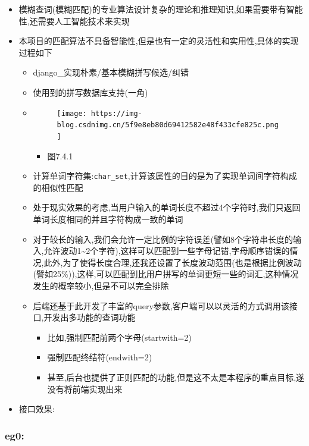 \documentclass[
]{article}
\begin{document}
\begin{itemize}
\item
  模糊查词(模糊匹配)的专业算法设计复杂的理论和推理知识,如果需要带有智能性,还需要人工智能技术来实现
\item
  本项目的匹配算法不具备智能性,但是也有一定的灵活性和实用性,具体的实现过程如下

  \begin{itemize}
  \item
    django\_实现朴素/基本模糊拼写候选/纠错
  \item
    使用到的拼写数据库支持(一角)
  \item
    \begin{figure}
    \centering
    \texttt{[image: https://img-blog.csdnimg.cn/5f9e8eb80d69412582e48f433cfe825c.png]}
    \caption{}
    \end{figure}

    \begin{itemize}
    \item
      图7.4.1
    \end{itemize}
  \item
    计算单词字符集:\texttt{char\_set},计算该属性的目的是为了实现单词间字符构成的相似性匹配
  \item
    处于现实效果的考虑,当用户输入的单词长度不超过4个字符时,我们只返回单词长度相同的并且字符构成一致的单词
  \item
    对于较长的输入,我们会允许一定比例的字符误差(譬如8个字符串长度的输入,允许波动1\textasciitilde2个字符),这样可以匹配到一些字母记错,字母顺序错误的情况,此外,为了使得长度合理,还我还设置了长度波动范围(也是根据比例波动(譬如25\%)),这样,可以匹配到比用户拼写的单词更短一些的词汇,这种情况发生的概率较小,但是不可以完全排除
  \item
    后端还基于此开发了丰富的query参数,客户端可以以灵活的方式调用该接口,开发出多功能的查词功能

    \begin{itemize}
    \item
      比如,强制匹配前两个字母(startwith=2)
    \item
      强制匹配终结符(endwith=2)
    \item
      甚至,后台也提供了正则匹配的功能,但是这不太是本程序的重点目标,遂没有将前端实现出来
    \end{itemize}
  \end{itemize}
\item
  接口效果:
\end{itemize}

\hypertarget{eg0}{%
\subsubsection{eg0:}\label{eg0}}
\end{document}
